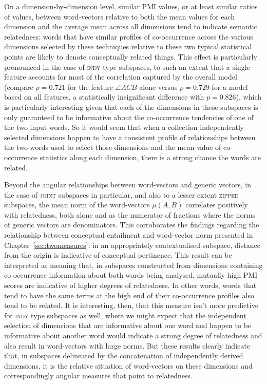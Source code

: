 On a dimension-by-dimension level, similar PMI values, or at least similar ratios of values, between word-vectors relative to both the mean values for each dimension and the average mean across all dimensions tend to indicate semantic relatedness: words that have similar profiles of co-occurrence across the various dimensions selected by these techniques relative to these two typical statistical points are likely to denote conceptually related things.  This effect is particularly pronounced in the case of \textsc{indy} type subspaces, to such an extent that a single feature accounts for most of the correlation captured by the overall model (compare $\rho = 0.721$ for the feature $\angle ACB$ alone versus $\rho = 0.729$ for a model based on all features, a statistically insignificant difference with $p = 0.826$), which is particularly interesting given that each of the dimensions in these subspaces is only guaranteed to be informative about the co-occurrence tendencies of one of the two input words.  So it would seem that when a collection independently selected dimensions happen to have a consistent profile of relationships between the two words used to select those dimensions and the mean value of co-occurrence statistics along each dimension, there is a strong chance the words are related.

Beyond the angular relationships between word-vectors and generic vectors, in the case of \textsc{joint} subspaces in particular, and also to a lesser extent \textsc{zipped} subspaces, the mean norm of the word-vectors $\mu(A,B)$ correlates positively with relatedness, both alone and as the numerator of fractions where the norms of generic vectors are denominators.  This corroborates the findings regarding the relationship between conceptual entailment and word-vector norm presented in Chapter~\ref{sec:twomeasures}: in an appropriately contextualised subspace, distance from the origin is indicative of conceptual pertinence.  This result can be interpreted as meaning that, in subspaces constructed from dimensions containing co-occurrence information about both words being analysed, mutually high PMI scores are indicative of higher degrees of relatedness.  In other words, words that tend to have the same terms at the high end of their co-occurrence profiles also tend to be related.  It is interesting, then, that this measure isn't more predictive for \textsc{indy} type subspaces as well, where we might expect that the independent selection of dimensions that are informative about one word and happen to be informative about another word would indicate a strong degree of relatedness and also result in word-vectors with large norms.  But these results clearly indicate that, in subspaces delineated by the concatenation of independently derived dimensions, it is the relative situation of word-vectors on these dimensions and correspondingly angular measures that point to relatedness.

